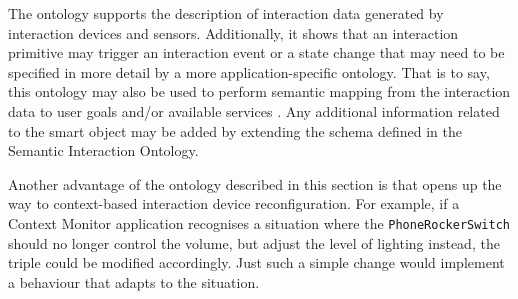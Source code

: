 % 
% 
% 
% 



The ontology supports the description of interaction data generated by interaction devices and sensors. Additionally, it shows that an interaction primitive may trigger an interaction event or a state change that may need to be specified in more detail by a more application-specific ontology. That is to say, this ontology may also be used to perform semantic mapping from the interaction data to user goals and/or available services \cite{Niezen2010}. Any additional information related to the smart object may be added by extending the schema defined in the Semantic Interaction Ontology. 

Another advantage of the ontology described in this section is that opens up the way to context-based interaction device reconfiguration. For example, if a Context Monitor application recognises a situation where the \texttt{PhoneRockerSwitch} should no longer control the volume, but adjust the level of lighting instead, the triple could be modified accordingly. Just such a simple change would implement a behaviour that adapts to the situation.

